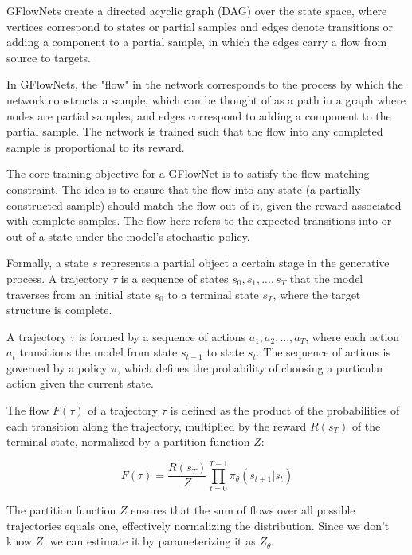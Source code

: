 GFlowNets create a directed acyclic graph (DAG) over the state space, where vertices correspond to states or partial samples and edges denote transitions or adding a component to a partial sample, in which the edges carry a flow from source to targets.

In GFlowNets, the "flow" in the network corresponds to the process by which the network constructs a sample, which can be thought of as a path in a graph where nodes are partial samples, and edges correspond to adding a component to the partial sample. The network is trained such that the flow into any completed sample is proportional to its reward.

The core training objective for a GFlowNet is to satisfy the flow matching constraint. The idea is to ensure that the flow into any state (a partially constructed sample) should match the flow out of it, given the reward associated with complete samples. The flow here refers to the expected transitions into or out of a state under the model's stochastic policy. 

Formally, a state \( s \) represents a partial object a certain stage in the generative process. A trajectory \( \tau \) is a sequence of states \( s_0, s_1, ..., s_T \) that the model traverses from an initial state \( s_0 \) to a terminal state \( s_T \), where the target structure is complete.

A trajectory \( \tau \) is formed by a sequence of actions \( a_1, a_2, ..., a_T \), where each action \( a_t \) transitions the model from state \( s_{t-1} \) to state \( s_t \). The sequence of actions is governed by a policy \( \pi \), which defines the probability of choosing a particular action given the current state.

The flow \( F(\tau) \) of a trajectory \( \tau \) is defined as the product of the probabilities of each transition along the trajectory, multiplied by the reward \( R(s_T) \) of the terminal state, normalized by a partition function \( Z \):

\begin{equation} \label{eq:flow}
    F(\tau) = \frac{R(s_T)}{Z} \prod_{t=0}^{T-1} \pi_\theta(s_{t+1} | s_{t})
\end{equation}

The partition function \( Z \) ensures that the sum of flows over all possible trajectories equals one, effectively normalizing the distribution. Since we don't know \( Z \), we can estimate it by parameterizing it as \( Z_{\theta} \).

